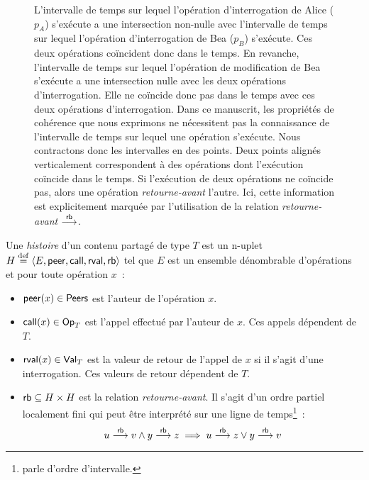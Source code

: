 \begin{figure}[ht]
\caption[Relation retourne-avant d'une histoire]{ L'intervalle de temps sur lequel l'opération d'interrogation de Alice ($p_A$) s'exécute a une intersection non-nulle avec l'intervalle de temps sur lequel l'opération d'interrogation de Bea ($p_B$) s'exécute.
Ces deux opérations coïncident donc dans le temps.
En revanche, l'intervalle de temps sur lequel l'opération de modification de Bea s'exécute a une intersection nulle avec les deux opérations d'interrogation.
Elle ne coïncide donc pas dans le temps avec ces deux opérations d'interrogation.
Dans ce manuscrit, les propriétés de cohérence que nous exprimons ne nécessitent pas la connaissance de l'intervalle de temps sur lequel une opération s'exécute.
 Nous contractons donc les intervalles en des points.
Deux points alignés verticalement correspondent à des opérations dont l'exécution coïncide dans le temps.
Si l'exécution de deux opérations ne coïncide pas, alors une opération \emph{retourne-avant} l'autre.
Ici, cette information est explicitement marquée par l'utilisation de la relation \emph{retourne-avant} $\rb$.}\label{fig:rb-example}
\end{figure}

\begin{definition}[histoire]\label{def:history}
Une \emph{histoire} d'un contenu partagé de type $T$ est un n-uplet $H \defeq \tuple*{E, \trm{peer}, \trm{call}, \trm{rval}, \trm{rb}}$ tel que $E$ est un ensemble dénombrable d'opérations et pour toute opération $x$~:
\begin{itemize}
\item $\trm{peer}(x) \in \trm{Peers}$ est l'auteur de l'opération $x$.
\item $\trm{call}(x) \in \trm{Op}_T$ est l'appel effectué par l'auteur de $x$.
Ces appels dépendent de $T$.
\item $\trm{rval}(x) \in \trm{Val}_T$ est la valeur de retour de l'appel de $x$ si il s'agit d'une interrogation.
Ces valeurs de retour dépendent de $T$.
\item $\trm{rb} \subseteq H \times H$ est la relation \emph{retourne-avant}.
Il s'agit d'un ordre partiel localement fini qui peut être interprété sur une ligne de temps\footnote{\textcite{greenough_1976_semiorder} parle d'ordre d'intervalle.}~:
\begin{equation*}
    u \rb v \land y \rb z \implies u \rb z \lor y \rb v
\end{equation*}
\end{itemize}
\end{definition}

